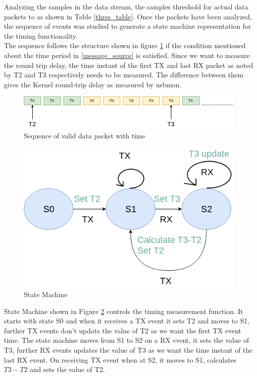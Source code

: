 Analyzing the samples in the data stream, the samples threshold for actual data packets to as shown in Table \ref{thres_table}.  Once the packets have been analyzed, the sequence of events was studied to generate a state machine representation for the timing functionality.\\ 
The sequence follows the structure shown in figure \ref{sequence} if the condition mentioned about the time period in \ref{message_source} is satisfied. Since we want to measure the round trip delay, the time instant of the first TX and last RX packet as noted by T2 and T3 respectively needs to be measured. The difference between them gives the Kernel round-trip delay as measured by usbmon.    
\begin{figure}[h!]
\centering
\includegraphics[width=\textwidth]{Figure/Sequence.png}
\caption{Sequence of valid data packet with time}
\label{sequence}
\end{figure}
\begin{figure}[h!]
\centering
\includegraphics[scale=0.5]{Figure/State_Machine.png}
\caption{State Machine}
\label{state_machine}
\end{figure}

State Machine shown in Figure \ref{state_machine} controls the timing measurement function. It starts with state S0 and when it receives a TX event it sets T2 and moves to S1, further TX events don't update the value of T2 as we want the first TX event time. The state machine moves from S1 to S2 on a RX event, it sets the value of T3, further RX events updates the value of T3 as we want the time instant of the last RX event. On receiving TX event when at S2, it moves to S1, calculates $T3-T2$ and sets the value of T2.
